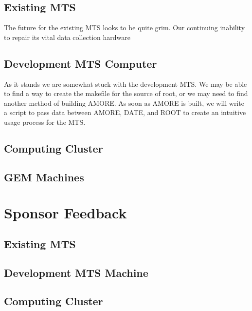\documentclass[12pt]{article}
\newcommand\tab[1][1cm]{\hspace*{#1}}
\begin{document}
\subsection{Existing MTS}

\tab The future for the existing MTS looks to be quite grim. Our continuing
inability to repair its vital data collection hardware 

\subsection{Development MTS Computer}
	As it stands we are somewhat stuck with the development MTS. We may be able to 
	find a way to create the makefile for the source of root, or we may need to 
	find another method of building AMORE. As soon as AMORE is built, we will write
	a script to pass data between AMORE, DATE, and ROOT to create an intuitive usage
	process for the MTS.
\tab 

\subsection{Computing Cluster}

\tab 

\subsection{GEM Machines}

\tab 

\section{Sponsor Feedback}

\subsection{Existing MTS}

\vspace{1in}

\subsection{Development MTS Machine}

\vspace{1in}

\subsection{Computing Cluster}
\end{document}
